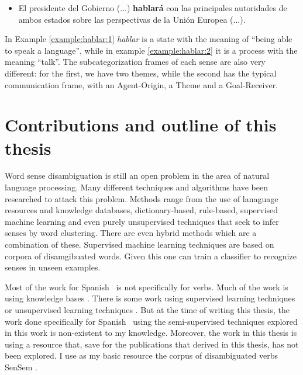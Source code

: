 \begin{example}\label{example:hablar:2}
  \begin{itemize}
    \item El presidente del Gobierno (...) {\bf hablar\'a} con las principales
      autoridades de ambos estados sobre las perspectivas de la Uni\'on Europea
      (...).
  \end{itemize}
\end{example}

In Example \ref{example:hablar:1} {\it hablar} is a state with the meaning of
``being able to speak a language'', while in example \ref{example:hablar:2} it
is a process with the meaning ``talk''. The subcategorization frames of each
sense are also very different: for the first, we have two themes, while the
second has the typical communication frame, with an Agent-Origin, a Theme and a
Goal-Receiver.

\section{Contributions and outline of this thesis}\label{section:outline}

Word sense disambiguation is still an open problem in the area of natural
language processing. Many different techniques and algorithms have been
researched to attack this problem. Methods range from the use of lanaguage
resources and knowledge databases, dictionary-based, rule-based, supervised
machine learning and even purely unsupervised techniques that seek to infer
senses by word clustering. There are even hybrid methods which are a
combination of these. Supervised machine learning techniques are based on
corpora of disamgibuated words. Given this one can train a classifier to
recognize senses in unseen examples.

Most of the work for Spanish \wsd~is not specifically for verbs. Much of the
work is using knowledge bases
\cite{Agirre:2014:RWK:2645242.2645245,Agirre:2009:PPW:1609067.1609070}. There
is some work using supervised learning techniques or unsupervised learning
techniques \cite{MihalceaEtAl2004}. But at the time of writing this thesis, the
work done specifically for Spanish \vsd~using the semi-supervised techniques
explored in this work is non-existent to my knowledge. Moreover, the work in
this thesis is using a resource that, save for the publications that derived in
this thesis, has not been explored. I use as my basic resource the corpus of
disambiguated verbs SenSem \cite{alonso-etal-07-sensem}.

